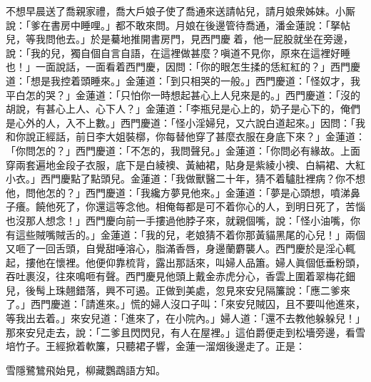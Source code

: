 不想早晨送了喬親家禮，喬大戶娘子使了喬通來送請帖兒，請月娘衆姊妹。小厮說：「爹在書房中睡哩。」都不敢來問。月娘在後邊管待喬通，潘金蓮說：「拏帖兒，等我問他去。」於是驀地推開書房門，見西門慶𢱉着，他一屁股就坐在旁邊，說：「我的兒，獨自個自言自語，在這裡做甚麼？嗔道不見你，原來在這裡好睡也！」一面說話，一面看着西門慶，因問：「你的眼怎生揉的恁紅紅的？」{}西門慶道：「想是我控着頭睡來。」金蓮道：「到只相哭的一般。」{}西門慶道：「怪奴才，我平白怎的哭？」金蓮道：「只怕你一時想起甚心上人兒來是的。」{}西門慶道：「沒的胡說，有甚心上人、心下人？」金蓮道：「李瓶兒是心上的，奶子是心下的，俺們是心外的人，入不上數。」西門慶道：「怪小淫婦兒，又六說白道起來。」因問：「我和你說正經話，前日李大姐裝槨，你每替他穿了甚麼衣服在身底下來？」金蓮道：「你問怎的？」西門慶道：「不怎的，我問聲兒。」金蓮道：「你問必有緣故。上面穿兩套遍地金段子衣服，底下是白綾襖、黃紬裙，貼身是紫綾小襖、白絹裙、大紅小衣。」西門慶點了點頭兒。金蓮道：「我做獸醫二十年，猜不着驢肚裡病？你不想他，問他怎的？」西門慶道：「我纔方夢見他來。」{}金蓮道：「夢是心頭想，噴涕鼻子癢。{}饒他死了，你還這等念他。相俺每都是可不着你心的人，到明日死了，苦惱也沒那人想念！」西門慶向前一手摟過他脖子來，就親個嘴，說：「怪小油嘴，你有這些賊嘴賊舌的。」金蓮道：「我的兒，老娘猜不着你那黃貓黑尾的心兒！」兩個又咂了一回舌頭，自覺甜唾溶心，脂滿香唇，身邊蘭麝襲人。西門慶於是淫心輒起，摟他在懷裡。他便仰靠梳背，露出那話來，叫婦人品簫。婦人眞個低垂粉頭，吞吐裹沒，往來鳴咂有聲。西門慶見他頭上戴金赤虎分心，香雲上圍着翠梅花鈿兒，後髩上珠翹錯落，興不可遏。{}正做到美處，忽見來安兒隔簾說：「應二爹來了。」西門慶道：「請進來。」慌的婦人沒口子叫：「來安兒賊囚，且不要叫他進來，等我出去着。」來安兒道：「進來了，在小院內。」婦人道：「還不去教他躲躲兒！」那來安兒走去，說：「二爹且閃閃兒，有人在屋裡。」這伯爵便走到松墻旁邊，看雪培竹子。王經掀着軟簾，只聽裙子響，金蓮一溜烟後邊走了。正是：

\begin{myquote} 
雪隱鷺鷥飛始見，柳藏鸚鵡語方知。
\end{myquote} 

